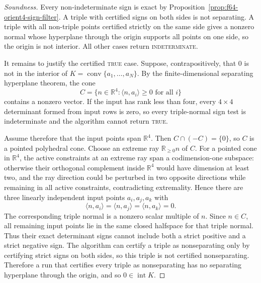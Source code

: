 \begin{proof}[Soundness]
Every non-indeterminate sign is exact by
Proposition~\ref{prop:f64-orient4-sign-filter}.  A triple with certified signs
on both sides is not separating.  A triple with all non-triple points certified
strictly on the same side gives a nonzero normal whose hyperplane through the
origin supports all points on one side, so the origin is not interior.  All
other cases return \textsc{indeterminate}.

It remains to justify the certified \textsc{true} case.  Suppose, contrapositively,
that $0$ is not in the interior of $K=\operatorname{conv}\{a_1,\ldots,a_N\}$.
By the finite-dimensional separating hyperplane theorem, the cone
\[
  C=\{n\in\mathbb R^4:\langle n,a_i\rangle\ge 0\text{ for all }i\}
\]
contains a nonzero vector.  If the input has rank less than four, every
$4\times4$ determinant formed from input rows is zero, so every triple-normal
sign test is indeterminate and the algorithm cannot return \textsc{true}.

Assume therefore that the input points span $\mathbb R^4$.  Then
$C\cap(-C)=\{0\}$, so $C$ is a pointed polyhedral cone.  Choose an extreme ray
$\mathbb R_{\ge0}n$ of $C$.  For a pointed cone in $\mathbb R^4$, the active
constraints at an extreme ray span a codimension-one subspace: otherwise their
orthogonal complement inside $\mathbb R^4$ would have dimension at least two,
and the ray direction could be perturbed in two opposite directions while
remaining in all active constraints, contradicting extremality.  Hence there
are three linearly independent input points
$a_i,a_j,a_k$ with
\[
  \langle n,a_i\rangle=\langle n,a_j\rangle=\langle n,a_k\rangle=0.
\]
The corresponding triple normal is a nonzero scalar multiple of $n$.  Since
$n\in C$, all remaining input points lie in the same closed halfspace for that
triple normal.  Thus their exact determinant signs cannot include both a
strict positive and a strict negative sign.  The algorithm can certify a triple
as nonseparating only by certifying strict signs on both sides, so this triple
is not certified nonseparating.  Therefore a run that certifies every triple as
nonseparating has no separating hyperplane through the origin, and so
$0\in\operatorname{int}K$.
\end{proof}
